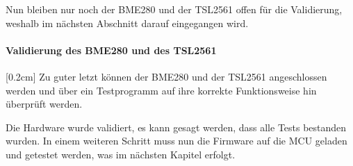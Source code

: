
Nun bleiben nur noch der BME280 und der TSL2561 offen für die Validierung, weshalb im nächsten Abschnitt darauf eingegangen wird.

\paragraph{\textbf{Validierung des BME280 und des TSL2561}}[0.2cm]
Zu guter letzt können der BME280 und der TSL2561 angeschlossen werden und über ein Testprogramm auf ihre korrekte Funktionsweise hin überprüft werden.


Die Hardware wurde validiert, es kann gesagt werden, dass alle Tests bestanden wurden. In einem weiteren Schritt muss nun die Firmware auf die MCU geladen und getestet werden, was im nächsten Kapitel erfolgt.